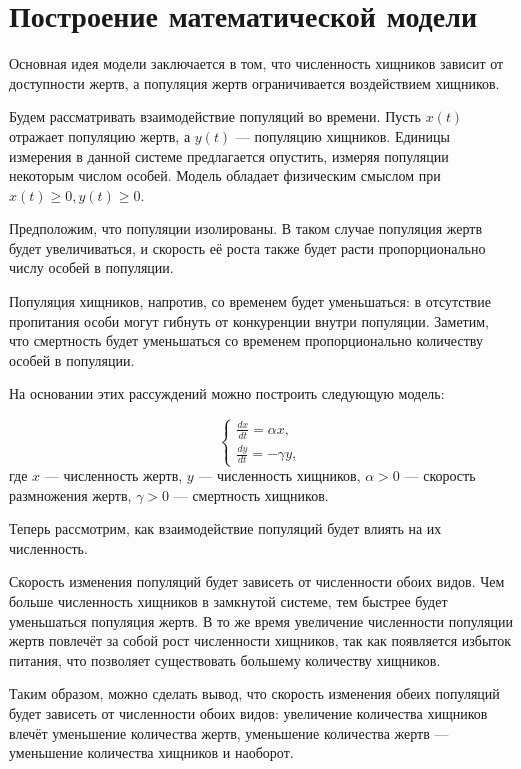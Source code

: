 \chapter{Построение математической модели}

Основная идея модели заключается в том, что численность хищников зависит от доступности жертв, а популяция жертв ограничивается воздействием хищников.

Будем рассматривать взаимодействие популяций во времени. Пусть $x(t)$ отражает популяцию жертв, а $y(t)$ — популяцию хищников. Единицы измерения в данной системе предлагается опустить, измеряя популяции некоторым числом особей. Модель обладает физическим смыслом при $x(t) \ge 0, y(t) \ge 0$.

Предположим, что популяции изолированы. В таком случае популяция жертв будет увеличиваться, и скорость её роста также будет расти пропорционально числу особей в популяции.

Популяция хищников, напротив, со временем будет уменьшаться: в отсутствие пропитания особи могут гибнуть от конкуренции внутри популяции. Заметим, что смертность будет уменьшаться со временем пропорционально количеству особей в популяции.

На основании этих рассуждений можно построить следующую модель:

\begin{equation}
	\begin{cases}
		\frac{dx}{dt} = \alpha x, \\
		\frac{dy}{dt} = -\gamma y,
	\end{cases}
	\label{eq:basic_model}
\end{equation}
где $x$ — численность жертв, $y$ — численность хищников, $\alpha > 0$ — скорость размножения жертв, $\gamma > 0$ — смертность хищников.

Теперь рассмотрим, как взаимодействие популяций будет влиять на их численность.

Скорость изменения популяций будет зависеть от численности обоих видов. Чем больше численность хищников в замкнутой системе, тем быстрее будет уменьшаться популяция жертв. В то же время увеличение численности популяции жертв повлечёт за собой рост численности хищников, так как появляется избыток питания, что позволяет существовать большему количеству хищников.

Таким образом, можно сделать вывод, что скорость изменения обеих популяций будет зависеть от численности обоих видов: увеличение количества хищников влечёт уменьшение количества жертв, уменьшение количества жертв — уменьшение количества хищников и наоборот.

